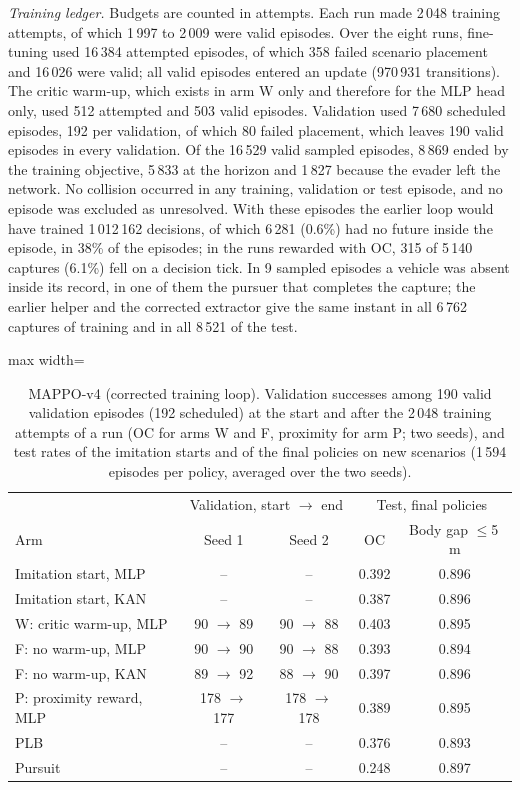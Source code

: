 \documentclass[preprint,12pt]{elsarticle}
\begin{document}
\emph{Training ledger.} Budgets are counted in attempts. Each run made 2\,048 training attempts, of which 1\,997
to 2\,009 were valid episodes. Over the eight runs, fine-tuning used 16\,384 attempted episodes, of which 358 failed
scenario placement and 16\,026 were valid; all valid episodes entered an update (970\,931 transitions). The critic
warm-up, which exists in arm W only and therefore for the MLP head only, used 512 attempted and 503 valid episodes.
Validation used 7\,680 scheduled episodes, 192 per validation, of which 80 failed placement, which leaves 190 valid
episodes in every validation. Of the 16\,529
valid sampled episodes, 8\,869 ended by the training objective, 5\,833 at the horizon and 1\,827 because the evader
left the network. No collision occurred in any training, validation or test episode, and no episode was excluded as
unresolved. With these episodes the earlier loop would have trained 1\,012\,162 decisions, of which 6\,281 (0.6\%)
had no future inside the episode, in 38\% of the episodes; in the runs rewarded with OC, 315 of 5\,140 captures
(6.1\%) fell on a decision tick. In 9 sampled episodes a vehicle was absent inside its record, in one of them the
pursuer that completes the capture; the earlier helper and the corrected extractor give the same instant in all
6\,762 captures of training and in all 8\,521 of the test.

\begin{table}[!h]
\centering
\caption{MAPPO-v4 (corrected training loop). Validation successes among 190 valid validation episodes (192
scheduled) at the start and after the 2\,048 training attempts of a run (OC for arms W and F, proximity for arm P; two seeds), and test rates of the imitation starts and of the
final policies on new scenarios (1\,594 episodes per policy, averaged over the two seeds).}
\label{tab:s-v4}
\begin{adjustbox}{max width=\textwidth}
\begin{tabular}{@{}lcccc@{}}
\toprule
& \multicolumn{2}{c}{Validation, start $\to$ end} & \multicolumn{2}{c}{Test, final policies} \\
Arm & Seed 1 & Seed 2 & OC & Body gap $\le$5\,m \\
\midrule
Imitation start, MLP & -- & -- & 0.392 & 0.896 \\
Imitation start, KAN & -- & -- & 0.387 & 0.896 \\
W: critic warm-up, MLP & 90 $\to$ 89 & 90 $\to$ 88 & 0.403 & 0.895 \\
F: no warm-up, MLP & 90 $\to$ 90 & 90 $\to$ 88 & 0.393 & 0.894 \\
F: no warm-up, KAN & 89 $\to$ 92 & 88 $\to$ 90 & 0.397 & 0.896 \\
P: proximity reward, MLP & 178 $\to$ 177 & 178 $\to$ 178 & 0.389 & 0.895 \\
\midrule
PLB & -- & -- & 0.376 & 0.893 \\
Pursuit & -- & -- & 0.248 & 0.897 \\
\bottomrule
\end{tabular}
\end{adjustbox}
\end{table}
\end{document}
